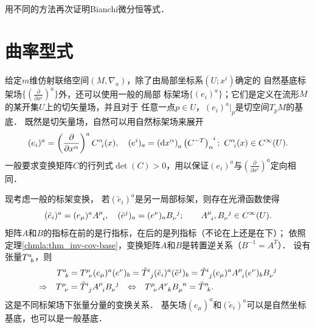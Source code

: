 

\begin{exercise}
	用不同的方法再次证明Bianchi微分恒等式．
\end{exercise}


\section{曲率型式}\label{chccr:sec_form1}
给定$m$维仿射联络空间$(M,\nabla_a)$，除了由局部坐标系$(U;x^i)$确定的
自然基底标架场$\{(\frac{\partial}{\partial x^i})^a\}$外，还可以使用一般的局部
标架场$\{(e_i)^a\}$；它们是定义在流形$M$的某开集$U$上的切矢量场，并且对于
任意一点$p\in U$，$(e_i)^a|_p$是切空间$T_p M$的基底．
既然是切矢量场，自然可以用自然标架场来展开
\begin{align}\label{chccr:eqn_natural-base_change}
    ({e} _i)^a = \left(\frac{\partial}{\partial x^\alpha}\right)^a C_{\hphantom{a} i}^{\alpha}(x) , \quad
    ({e} ^i)_a = \left({\rm d} x^\alpha \right)_a \left(C^{-T}\right)^{\hphantom{\alpha}i}_{\alpha}   ;
    \ C_{\hphantom{a} i}^{\alpha}(x) \in C^{\infty}(U).
\end{align}
一般要求变换矩阵$C$的行列式$\det(C)>0$，用以保证$(e_i)^a$与$(\frac{\partial}{\partial x^i})^a$定向相同．



现考虑一般的标架变换，
若$(\tilde{e}_i)^a$是另一局部标架，则存在光滑函数使得
\begin{align}\label{chccr:base_change}
    (\tilde{e} _i)^a = (e_\mu)^{a} A_{\hphantom{a} i}^{\mu} , \quad
    (\tilde{e} ^j)_a = (e^\nu)_{a} B^{\hphantom{a} j}_{\nu};
    \qquad A_{\hphantom{a} i}^{\mu},B^{\hphantom{a} j}_{\nu} \in C^{\infty}(U) .
\end{align}
矩阵$A$和$B$的指标在前的是行指标，在后的是列指标（不论在上还是在下）；
依照定理\ref{chmla:thm_inv-cov-base}，变换矩阵$A$和$B$是转置逆关系（$B^{-1} = A^T$）．
设有张量$T^a _{\hphantom{a} b}$，则
\begin{align}
    T^a _{\hphantom{a} b} &= T^{\mu} _{\hphantom{a} \nu}(e_\mu)^{a} (e^\nu)_{b}
    = \tilde{T}^{i} _{\hphantom{a} j} (\tilde{e} _i)^a (\tilde{e} ^j)_b
    = \tilde{T}^{i} _{\hphantom{a} j} (e_\mu)^{a} A_{\hphantom{a} i}^{\mu} (e^\nu)_{b} B^{\hphantom{a} j}_{\nu}
    \notag \\ {\Rightarrow \quad }
    T^{\mu} _{\hphantom{a} \nu} &= \tilde{T}^{i} _{\hphantom{a} j} A_{\hphantom{a} i}^{\mu} B^{\hphantom{a} j}_{\nu}
    {\quad \Leftrightarrow\quad }
    T^{\mu} _{\hphantom{a} \nu} A_{\hphantom{a} k}^{\nu}  B^{\hphantom{a} n}_{\mu} = \tilde{T}^{n} _{\hphantom{a} k} .
\end{align}
这是不同标架场下张量分量的变换关系．
基矢场$(e_\mu)^{a}$和$(\tilde{e} _i)^a$可以是自然坐标基底，也可以是一般基底．



